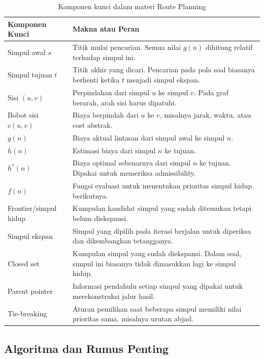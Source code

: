 \begin{table}[H]
\centering
\small
\begin{tabularx}{\textwidth}{|L{0.28\textwidth}|X|}
\hline
\textbf{Komponen Kunci} & \textbf{Makna atau Peran} \\
\hline
Simpul awal $s$ & Titik mulai pencarian. Semua nilai $g(n)$ dihitung relatif terhadap simpul ini. \\
\hline
Simpul tujuan $t$ & Titik akhir yang dicari. Pencarian pada pola soal biasanya berhenti ketika $t$ menjadi simpul ekspan. \\
\hline
Sisi $(u,v)$ & Perpindahan dari simpul $u$ ke simpul $v$. Pada graf berarah, arah sisi harus dipatuhi. \\
\hline
Bobot sisi $c(u,v)$ & Biaya berpindah dari $u$ ke $v$, misalnya jarak, waktu, atau cost abstrak. \\
\hline
$g(n)$ & Biaya aktual lintasan dari simpul awal ke simpul $n$. \\
\hline
$h(n)$ & Estimasi biaya dari simpul $n$ ke tujuan. \\
\hline
$h^*(n)$ & Biaya optimal sebenarnya dari simpul $n$ ke tujuan. Dipakai untuk memeriksa admissibility. \\
\hline
$f(n)$ & Fungsi evaluasi untuk menentukan prioritas simpul hidup berikutnya. \\
\hline
Frontier/simpul hidup & Kumpulan kandidat simpul yang sudah ditemukan tetapi belum diekspansi. \\
\hline
Simpul ekspan & Simpul yang dipilih pada iterasi berjalan untuk diperiksa dan dikembangkan tetangganya. \\
\hline
Closed set & Kumpulan simpul yang sudah diekspansi. Dalam soal, simpul ini biasanya tidak dimasukkan lagi ke simpul hidup. \\
\hline
Parent pointer & Informasi pendahulu setiap simpul yang dipakai untuk merekonstruksi jalur hasil. \\
\hline
Tie-breaking & Aturan pemilihan saat beberapa simpul memiliki nilai prioritas sama, misalnya urutan abjad. \\
\hline
\end{tabularx}
\caption{Komponen kunci dalam materi Route Planning}
\label{tab:komponen-kunci-route-planning}
\end{table}

\subsection{Algoritma dan Rumus Penting}

